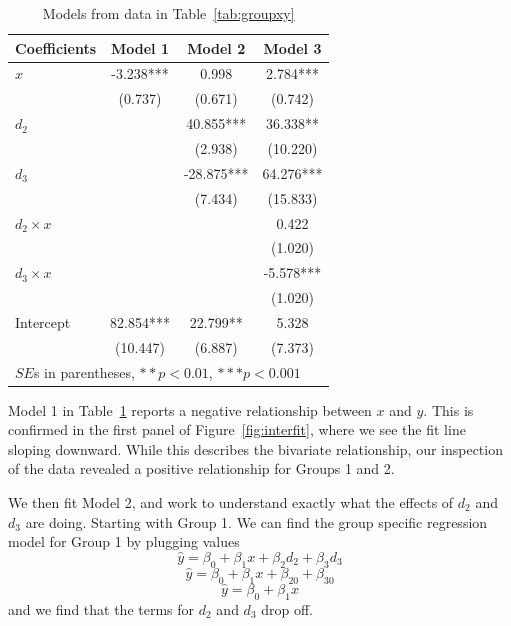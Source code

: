 \begin{table}[htbp]\centering
\caption{Models from data in Table~\ref{tab:groupxy}
\label{tab:interreg}}
\begin{tabular}{lccc}
\hline
Coefficients&Model 1&Model 2&Model 3 \\
\hline
$x$     &   -3.238***&    0.998  &    2.784***\\
      &   (0.737)  &   (0.671)  &   (0.742)  \\
$d_2$  &        &   40.855***&   36.338** \\
      &        &   (2.938)  &  (10.220)  \\
$d_3$  &        &   -28.875***&   64.276***\\
      &        &   (7.434)  &  (15.833)  \\
$d_2 \times x$  &        &        &    0.422  \\
      &        &        &   (1.020)  \\
$d_3 \times x$  &        &        &   -5.578***\\
      &        &        &   (1.020)  \\
Intercept  &   82.854***&   22.799** &    5.328  \\
      &  (10.447)  &   (6.887)  &   (7.373)  \\
\hline
\multicolumn{4}{l}{$SE$s in parentheses, $**p<0.01$, $***p<0.001$} \\
\hline
\end{tabular}
\end{table}
Model 1 in Table~\ref{tab:interreg} reports a negative relationship between $x$ and $y$. This is confirmed in the first panel of Figure~\ref{fig:interfit}, where we see the fit line sloping downward. While this describes the bivariate relationship, our inspection of the data revealed a positive relationship for Groups 1 and 2.

We then fit Model 2, and work to understand exactly what the effects of $d_2$ and $d_3$ are doing. Starting with Group 1. We can find the group specific regression model for Group 1 by plugging values
\[
\hat{y}=\beta_0+\beta_1x+\beta_2d_{2}+\beta_3d_{3}
\]
\[
\hat{y}=\beta_0+\beta_1x+\beta_20+\beta_30
\]
\[
\hat{y}=\beta_0+\beta_1x
\]
and we find that the terms for $d_2$ and $d_3$ drop off.

